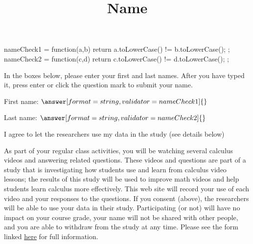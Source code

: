 \documentclass[handout]{ximera}
\title{Name}
\begin{document}
\begin{abstract}
\end{abstract}


\maketitle


\begin{javascript}
  nameCheck1 = function(a,b) {
    return a.toLowerCase() != b.toLowerCase();
  };
    nameCheck2 = function(c,d) {
    return c.toLowerCase() != d.toLowerCase();
  };
\end{javascript}

In the boxes below, please enter your first and last names. After you have typed it, press enter or click the question mark to submit your name.\\

\begin{question}
First name:
$\answer[format=string,validator=nameCheck1]{}$
\end{question}

\begin{question}
Last name:
$\answer[format=string,validator=nameCheck2]{}$
\end{question}

\begin{question}
I agree to let the researchers use my data in the study (see details below)

\begin{multipleChoice}
\end{multipleChoice}

As part of your regular class activities, you will be watching several calculus videos and answering related questions. These videos and questions are part of a study that is investigating how students use and learn from calculus video lessons; the results of this study will be used to improve math videos and help students learn calculus more effectively. This web site will record your use of each video and your responses to the questions. If you consent (above), the researchers will be able to use your data in their study. Participating (or not) will have no impact on your course grade, your name will not be shared with other people, and you are able to withdraw from the study at any time. Please see the form linked \href{http://calcvids.org/pages/consent_form.pdf}{here} for full information.

\end{question}
\end{document}
